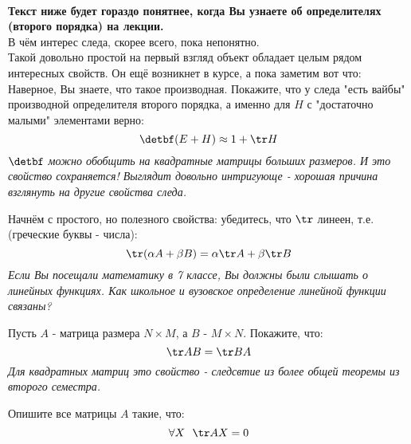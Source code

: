	\begin{problem} 
		\textbf{\\Текст ниже будет гораздо понятнее, когда Вы узнаете об определителях (второго порядка) на лекции.} \\
		В чём интерес следа, скорее всего, пока непонятно. \\
		Такой довольно простой на первый взгляд объект обладает целым рядом интересных свойств. Он ещё возникнет в курсе, а пока заметим вот что: \\
		Наверное, Вы знаете, что такое производная.  Покажите, что у следа "есть вайбы" производной определителя второго порядка, а именно для $H$ с "достаточно малыми" элементами верно:
		$$ \detbf (E + H) \approx 1 + \tr H$$
		\textit{$\detbf$ можно обобщить на квадратные матрицы больших размеров. И это свойство сохраняется! Выглядит довольно интригующе - хорошая причина взглянуть на другие свойства следа.}
	\end{problem}

	\begin{problem}
		Начнём с простого, но полезного свойства: убедитесь, что $\tr$  линеен, т.е. (греческие буквы - числа):
		$$ \tr(\alpha A + \beta B) = \alpha \tr A + \beta \tr B$$
		\textit{Если Вы посещали математику в 7 классе, Вы должны были слышать о линейных функциях. Как школьное и вузовское определение линейной функции связаны?}
	\end{problem}

	\begin{problem}
		Пусть $A$ - матрица размера $N \times M$, а $B$ - $M \times N$. Покажите, что:
		$$\tr AB = \tr BA$$
		\textit{Для квадратных матриц это свойство - следсвтие из более общей теоремы из второго семестра.}
	\end{problem}
	
	\begin{problem} [Г7.12]
		Опишите все матрицы $A$ такие, что:
		$$ \forall X \ \ \tr AX = 0 $$
	\end{problem}

